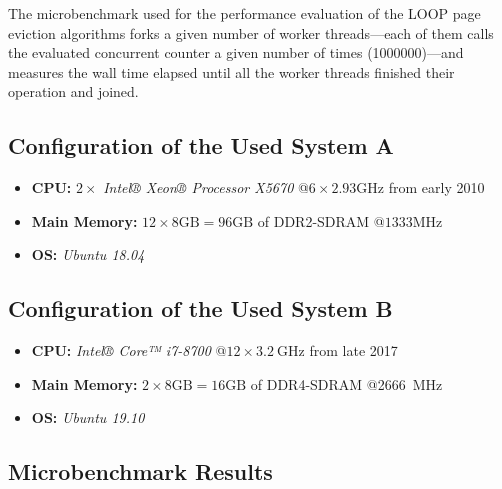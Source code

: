     The microbenchmark used for the performance evaluation of the LOOP page eviction algorithms forks a given number of worker threads---each of them calls the evaluated concurrent counter a given number of times (\num{1000000})---and measures the wall time elapsed until all the worker threads finished their operation and joined.

\subsection[System A Configuration]{Configuration of the Used System A}

\begin{@empty}
    \begin{itemize}
        \itemsep0em
        \item \textbf{CPU:} $2 \times $ \emph{Intel® Xeon® Processor X5670} @$6 \times 2.93\text{GHz}$ from early 2010
        \item \textbf{Main Memory:} $12 \times 8\text{GB} = 96\text{GB}$ of DDR2-SDRAM @$1333\text{MHz}$
        \item \textbf{OS:} \emph{Ubuntu 18.04}
    \end{itemize}
\end{@empty}

\subsection[System B Configuration]{Configuration of the Used System B}

\begin{@empty}
    \begin{itemize}
        \itemsep0em
		\item	\textbf{CPU:} \emph{Intel® Core™ i7-8700} @$12 \times \SI{3.2}{\giga\hertz}$ from late 2017
        \item	\textbf{Main Memory:} $2 \times 8\text{GB} = 16\text{GB}$ of DDR4-SDRAM @\SI{2666}{\mega\hertz}
        \item	\textbf{OS:} \emph{Ubuntu 19.10}
    \end{itemize}
\end{@empty}

\subsection[Microbenchmark Results]{Microbenchmark Results} \label{subsec:loop-results}

